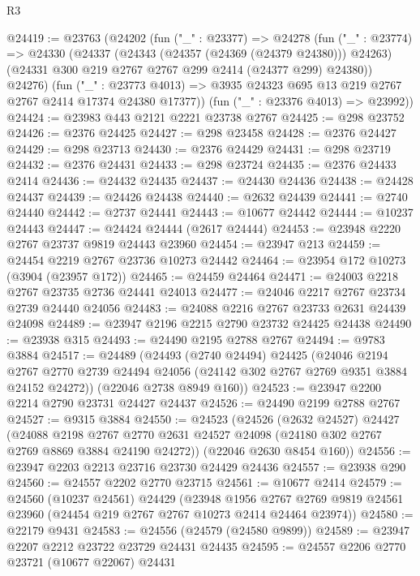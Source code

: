 \begin{lexlean}{R3}
\begin{coremodule}
@24419 := @23763
    (@24202
      (fun ("_" : @23377) =>
      @24278
        (fun ("_" : @23774) =>
        @24330
          (@24337
            (@24343 (@24357 (@24369 (@24379 @24380))) @24263)
            (@24331 @300 @219 @2767 @2767 @299 @2414 (@24377 @299) @24380))
          @24276)
        (fun ("_" : @23773 @4013) =>
        @3935 @24323 @695 @13 @219 @2767 @2767 @2414 @17374 @24380 @17377))
      (fun ("_" : @23376 @4013) => @23992))
@24424 := @23983 @443 @2121 @2221 @23738 @2767
@24425 := @298 @23752
@24426 := @2376 @24425
@24427 := @298 @23458
@24428 := @2376 @24427
@24429 := @298 @23713
@24430 := @2376 @24429
@24431 := @298 @23719
@24432 := @2376 @24431
@24433 := @298 @23724
@24435 := @2376 @24433 @2414
@24436 := @24432 @24435
@24437 := @24430 @24436
@24438 := @24428 @24437
@24439 := @24426 @24438
@24440 := @2632 @24439
@24441 := @2740 @24440
@24442 := @2737 @24441
@24443 := @10677 @24442
@24444 := @10237 @24443
@24447 := @24424 @24444 (@2617 @24444)
@24453 := @23948 @2220 @2767 @23737 @9819 @24443 @23960
@24454 := @23947 @213
@24459 := @24454 @2219 @2767 @23736 @10273 @24442
@24464 := @23954 @172 @10273 (@3904 (@23957 @172))
@24465 := @24459 @24464
@24471 := @24003 @2218 @2767 @23735 @2736 @24441 @24013
@24477 := @24046 @2217 @2767 @23734 @2739 @24440 @24056
@24483 := @24088 @2216 @2767 @23733 @2631 @24439 @24098
@24489 := @23947 @2196 @2215 @2790 @23732 @24425 @24438
@24490 := @23938 @315
@24493 := @24490 @2195 @2788 @2767
@24494 := @9783 @3884
@24517 := @24489
    (@24493
      (@2740 @24494)
      @24425
      (@24046
        @2194
        @2767
        @2770
        @2739
        @24494
        @24056
        (@24142 @302 @2767 @2769 @9351 @3884 @24152 @24272))
      (@22046 @2738 @8949 @160))
@24523 := @23947 @2200 @2214 @2790 @23731 @24427 @24437
@24526 := @24490 @2199 @2788 @2767
@24527 := @9315 @3884
@24550 := @24523
    (@24526
      (@2632 @24527)
      @24427
      (@24088
        @2198
        @2767
        @2770
        @2631
        @24527
        @24098
        (@24180 @302 @2767 @2769 @8869 @3884 @24190 @24272))
      (@22046 @2630 @8454 @160))
@24556 := @23947 @2203 @2213 @23716 @23730 @24429 @24436
@24557 := @23938 @290
@24560 := @24557 @2202 @2770 @23715
@24561 := @10677 @2414
@24579 := @24560
    (@10237 @24561)
    @24429
    (@23948
      @1956
      @2767
      @2769
      @9819
      @24561
      @23960
      (@24454 @219 @2767 @2767 @10273 @2414 @24464 @23974))
@24580 := @22179 @9431
@24583 := @24556 (@24579 (@24580 @9899))
@24589 := @23947 @2207 @2212 @23722 @23729 @24431 @24435
@24595 := @24557 @2206 @2770 @23721 (@10677 @22067) @24431

\end{coremodule}
\end{lexlean}
